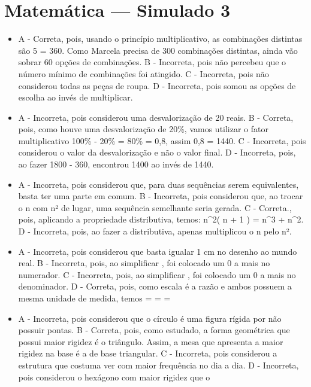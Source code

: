 \section*{Matemática — Simulado 3}
\begin{itemize}
\item A - Correta, pois, usando o princípio multiplicativo, as combinações
distintas são 5     = 360. Como Marcela precisa de 300 combinações distintas, ainda vão sobrar 60
opções de combinações.
B - Incorreta, pois não percebeu que o número mínimo de combinações foi
atingido.
C - Incorreta, pois não considerou todas as peças de roupa.
D - Incorreta, pois somou as opções de escolha ao invés de multiplicar.
\item A - Incorreta, pois considerou uma desvalorização de 20 reais.
B - Correta, pois, como houve uma desvalorização de 20\%, vamos utilizar
o fator multiplicativo 100\% - 20\% = 80\% = 0,8, assim 0,8  = 1440.
C - Incorreta, pois considerou o valor da desvalorização e não o valor
final.
D - Incorreta, pois, ao fazer 1800 - 360, encontrou 1400 ao invés de
1440.
\item A - Incorreta, pois considerou que, para duas sequências serem
equivalentes, basta ter uma parte em comum.
B - Incorreta, pois considerou que, ao trocar o n com n² de lugar, uma
sequência semelhante seria gerada.
C - Correta., pois, aplicando a propriedade distributiva, temos:
n^{2}\left( n + 1 \right) = n^{3} + n^{2}.
D - Incorreta, pois, ao fazer a distributiva, apenas multiplicou o n
pelo n².
\item A - Incorreta, pois considerou que basta igualar 1 cm no desenho ao
mundo real.
B - Incorreta, pois, ao simplificar , foi colocado
um 0 a mais no numerador.
C - Incorreta, pois, ao simplificar , foi colocado
um 0 a mais no denominador.
D - Correta, pois, como escala é a razão
 e ambos possuem a mesma unidade
de medida, temos  =  =  = 
\item A - Incorreta, pois considerou que o círculo é uma figura rígida por não
possuir pontas.
B - Correta, pois, como estudado, a forma geométrica que possui maior
rigidez é o triângulo. Assim, a mesa que apresenta a maior rigidez na
base é a de base triangular.
C - Incorreta, pois considerou a estrutura que costuma ver com maior
frequência no dia a dia.
D - Incorreta, pois considerou o hexágono com maior rigidez que o

\end{itemize}
